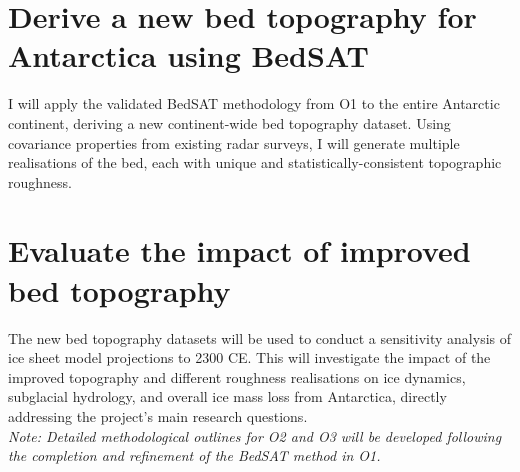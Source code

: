 \section{Derive a new bed topography for Antarctica using BedSAT}
I will apply the validated BedSAT methodology from O1 to the entire Antarctic continent, deriving a new continent-wide bed topography dataset. Using covariance properties from existing radar surveys, I will generate multiple realisations of the bed, each with unique and statistically-consistent topographic roughness.

\section{Evaluate the impact of improved bed topography}
The new bed topography datasets will be used to conduct a sensitivity analysis of ice sheet model projections to 2300 CE. This will investigate the impact of the improved topography and different roughness realisations on ice dynamics, subglacial hydrology, and overall ice mass loss from Antarctica, directly addressing the project's main research questions.
\\
\textit{Note: Detailed methodological outlines for O2 and O3 will be developed following the completion and refinement of the BedSAT method in O1.}



